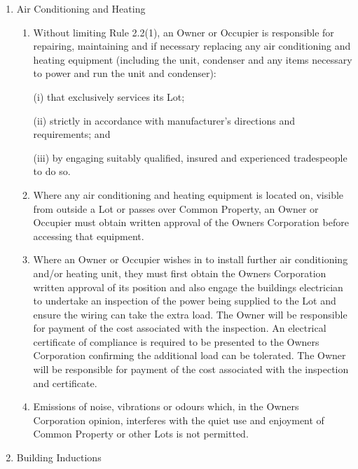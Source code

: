 \documentclass{article}
\begin{document}
\begin{enumerate}[label=\arabic*.]
\begin{enumerate}[label=\arabic{enumi}.\arabic*.]
\begin{enumerate}[label=(\arabic*)]
\begin{enumerate}[label=(\alph*)]
\end{enumerate}

\item  Air Conditioning and Heating

\begin{enumerate}[label=(\alph*)]

\item  Without limiting Rule 2.2(1), an Owner or Occupier is responsible for repairing, maintaining and if necessary replacing any air conditioning and heating equipment (including the unit, condenser and any items necessary to power and run the unit and condenser):

(i) that exclusively services its Lot;

(ii) strictly in accordance with manufacturer’s directions and requirements; and

(iii) by engaging suitably qualified, insured and experienced tradespeople to do so.

\item  Where any air conditioning and heating equipment is located on, visible from outside a Lot or passes over Common Property, an Owner or Occupier must obtain written approval of the Owners Corporation before accessing that equipment.

\item  Where an Owner or Occupier wishes in to install further air conditioning and/or heating unit, they must first obtain the Owners Corporation written approval of its position and also engage the buildings electrician to undertake an inspection of the power being supplied to the Lot and ensure the wiring can take the extra load. The Owner will be responsible for payment of the cost associated with the inspection. An electrical certificate of compliance is required to be presented to the Owners Corporation confirming the additional load can be tolerated. The Owner will be responsible for payment of the cost associated with the inspection and certificate.

\item  Emissions of noise, vibrations or odours which, in the Owners Corporation opinion, interferes with the quiet use and enjoyment of Common Property or other Lots is not permitted.
\newpage



\end{enumerate}

\item  Building Inductions

\begin{enumerate}[label=(\alph*)]


\end{enumerate}
\end{enumerate}
\end{enumerate}
\end{enumerate}
\end{document}
